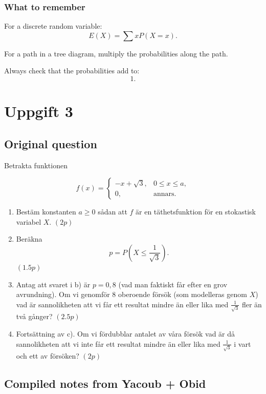 \documentclass[10pt]{article}
\begin{document}
\subsubsection*{What to remember}

For a discrete random variable:
\[
E(X)=\sum xP(X=x).
\]

For a path in a tree diagram, multiply the
probabilities along the path.

Always check that the probabilities add to:
\[
1.
\]

\section*{Uppgift 3}

\subsection*{Original question}

Betrakta funktionen

\[
f(x)=
\begin{cases}
-x+\sqrt{3},
& 0\le x\le a,\\
0,
& \text{annars}.
\end{cases}
\]

\begin{enumerate}[label=\alph*)]
\item Bestäm konstanten \(a\ge 0\) sådan att
\(f\) är en täthetsfunktion för en stokastisk
variabel \(X\). \((2p)\)

\item Beräkna
\[
p=P\left(X\le \frac{1}{\sqrt{3}}\right).
\]
\((1.5p)\)

\item Antag att svaret i b) är \(p=0,8\)
(vad man faktiskt får efter en grov avrundning).
Om vi genomför 8 oberoende försök
(som modelleras genom \(X\)) vad är sannolikheten
att vi får ett resultat mindre än eller lika med
\(\frac{1}{\sqrt{3}}\) fler än två gånger?
\((2.5p)\)

\item Fortsättning av c). Om vi fördubblar antalet
av våra försök vad är då sannolikheten att vi inte
får ett resultat mindre än eller lika med
\(\frac{1}{\sqrt{3}}\) i vart och ett av försöken?
\((2p)\)
\end{enumerate}

\subsection*{Compiled notes from Yacoub + Obid}
\end{document}
